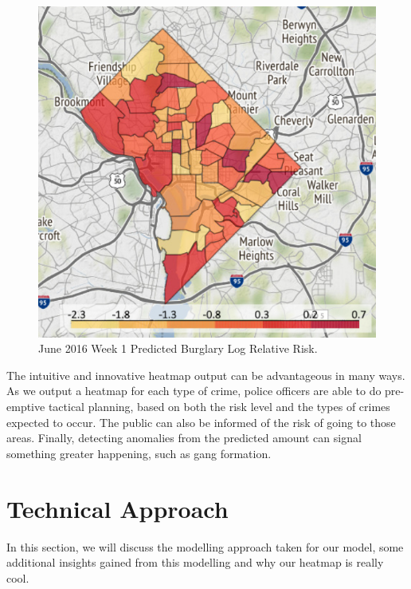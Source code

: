 \documentclass[letterpaper]{article}
\begin{document}
	\begin{figure}[!ht]
		\includegraphics[width=\linewidth]{./p1.png}
		\caption{June 2016 Week 1 Predicted Burglary Log Relative Risk.}
		\label{p1}
	\end{figure}

	The intuitive and innovative heatmap output can be advantageous in many ways.
	As we output a heatmap for each type of crime, police officers are able to do pre-emptive tactical planning, based on both the risk level and the types of crimes expected to occur.
	The public can also be informed of the risk of going to those areas. 
	Finally, detecting anomalies from the predicted amount can signal something greater happening, such as gang formation.
	
	\section{Technical Approach}
	
	In this section, we will discuss the modelling approach taken for our model, some additional insights gained from this modelling and why our heatmap is really cool.
	
\end{document}
